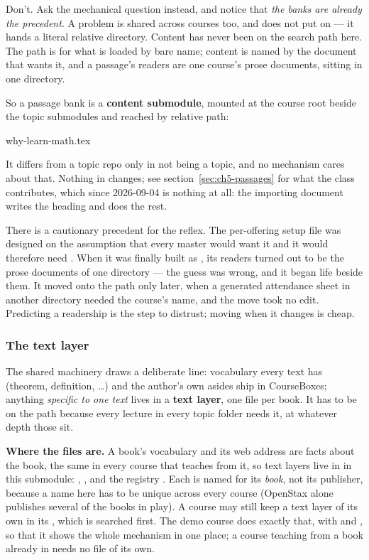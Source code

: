 Don't. Ask the mechanical question instead, and notice that \emph{the banks
are already the precedent}. A problem is shared across courses too, and
 does not put  on  --- it
hands  a literal relative directory. Content has never been on
the search path here. The path is for what is loaded by bare name; content
is named by the document that wants it, and a passage's readers are one
course's prose documents, sitting in one directory.

So a passage bank is a \textbf{content submodule}, mounted at the course root
beside the topic submodules and reached by relative path:

\begin{manexsource}
{why-learn-math.tex}
\end{manexsource}

\noindent It differs from a topic repo only in not being a topic, and no
mechanism cares about that. Nothing in  changes; see
section~\ref{sec:ch5-passages} for what the class contributes, which since
2026-09-04 is nothing at all: the importing document writes the heading and
 does the rest.

There is a cautionary precedent for the reflex. The per-offering setup file
was designed on the assumption that every master would want it and it would
therefore need . When it was finally built as
, its readers turned out to be the prose documents of
one directory --- the guess was wrong, and it began life beside them.
It moved onto the path only later, when a generated attendance sheet in another directory needed the course's name, and the move took no edit.
Predicting a readership is the step to distrust; moving when it changes is cheap.

\subsubsection*{The text layer}

The shared machinery draws a deliberate line: vocabulary every text has
(theorem, definition, \dots) and the author's own asides ship in
CourseBoxes; anything \emph{specific to one text} lives in a
\textbf{text layer}, one file per book.
It has to be on the path because every lecture in every topic folder needs it, at whatever depth those sit.

\textbf{Where the files are.}
A book's vocabulary and its web address are facts about the book, the same in every course that teaches from it, so text layers live in  in this submodule: , , and the registry .
Each is named for its \emph{book}, not its publisher, because a name here has to be unique across every course (OpenStax alone publishes several of the books in play).
A course may still keep a text layer of its own in its , which is searched first.
The demo course does exactly that, with  and , so that it shows the whole mechanism in one place; a course teaching from a book already in  needs no file of its own.

